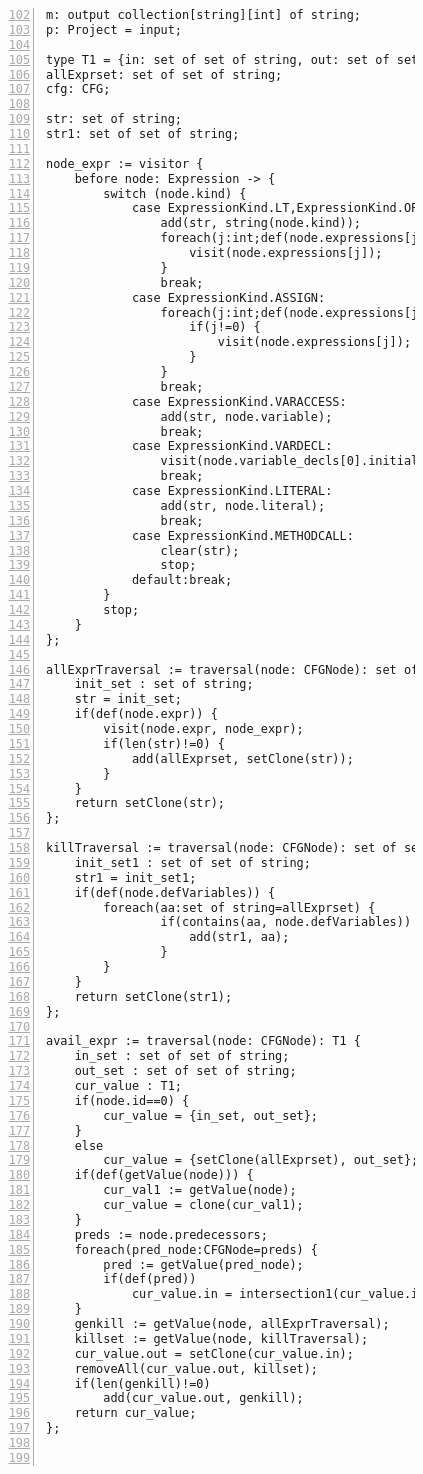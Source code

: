 \begin{figure}[ht!]
\begin{lstlisting}[numbers=left, tabsize=4, escapechar=@, caption={Available expression analysis},label={lst:ae-code},firstline=102, firstnumber=102] 
m: output collection[string][int] of string;
p: Project = input;

type T1 = {in: set of set of string, out: set of set of string};
allExprset: set of set of string;
cfg: CFG;

str: set of string;
str1: set of set of string;

node_expr := visitor {
	before node: Expression -> {
		switch (node.kind) {
			case ExpressionKind.LT,ExpressionKind.OP_ADD, ExpressionKind.OP_SUB, ExpressionKind.OP_INC, ExpressionKind.OP_MULT, ExpressionKind.OP_DIV, ExpressionKind.OP_MOD, ExpressionKind.OP_DEC, ExpressionKind.GT, ExpressionKind.EQ, ExpressionKind.NEQ, ExpressionKind.LTEQ, ExpressionKind.GTEQ, ExpressionKind.LOGICAL_NOT, ExpressionKind.LOGICAL_AND, ExpressionKind.LOGICAL_OR, ExpressionKind.BIT_AND, ExpressionKind.BIT_OR, ExpressionKind.BIT_NOT, ExpressionKind.BIT_XOR, ExpressionKind.BIT_LSHIFT, ExpressionKind.BIT_RSHIFT, ExpressionKind.BIT_UNSIGNEDRSHIFT:
				add(str, string(node.kind)); 
				foreach(j:int;def(node.expressions[j])) {
					visit(node.expressions[j]);
				}
				break;
			case ExpressionKind.ASSIGN:
				foreach(j:int;def(node.expressions[j])) {
					if(j!=0) {
						visit(node.expressions[j]);
					}
				}
				break;
			case ExpressionKind.VARACCESS:
				add(str, node.variable);
				break;
			case ExpressionKind.VARDECL:
				visit(node.variable_decls[0].initializer);
				break;
			case ExpressionKind.LITERAL:
				add(str, node.literal);
				break;
			case ExpressionKind.METHODCALL:
				clear(str);
				stop;
			default:break;
		}
		stop;
	}
};

allExprTraversal := traversal(node: CFGNode): set of string {
	init_set : set of string;
	str = init_set;
	if(def(node.expr)) {
		visit(node.expr, node_expr);
		if(len(str)!=0) {
			add(allExprset, setClone(str));
		}
	}
	return setClone(str);
};

killTraversal := traversal(node: CFGNode): set of set of string {
	init_set1 : set of set of string;
	str1 = init_set1;
	if(def(node.defVariables)) {
		foreach(aa:set of string=allExprset) {
				if(contains(aa, node.defVariables)) {
					add(str1, aa);
				}
		}
	}
	return setClone(str1);
};

avail_expr := traversal(node: CFGNode): T1 {
	in_set : set of set of string;
	out_set : set of set of string;
	cur_value : T1;
	if(node.id==0) {
		cur_value = {in_set, out_set};
	}
	else
		cur_value = {setClone(allExprset), out_set};
	if(def(getValue(node))) {
		cur_val1 := getValue(node);
		cur_value = clone(cur_val1);
	}
	preds := node.predecessors;
	foreach(pred_node:CFGNode=preds) {	
		pred := getValue(pred_node);
		if(def(pred))
			cur_value.in = intersection1(cur_value.in, pred.out);
	}
	genkill := getValue(node, allExprTraversal);
	killset := getValue(node, killTraversal);
	cur_value.out = setClone(cur_value.in);
	removeAll(cur_value.out, killset);
	if(len(genkill)!=0)
		add(cur_value.out, genkill);
	return cur_value;
};



\end{lstlisting}
\end{figure}
